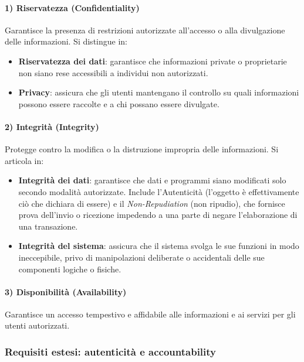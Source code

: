 \paragraph{1) Riservatezza (Confidentiality)}

Garantisce la presenza di restrizioni autorizzate all'accesso o alla divulgazione
delle informazioni. Si distingue in:
\begin{itemize}
\item \textbf{Riservatezza dei dati}: garantisce che informazioni private o
proprietarie non siano rese accessibili a individui non autorizzati.
\item \textbf{Privacy}: assicura che gli utenti mantengano il controllo su quali
informazioni possono essere raccolte e a chi possano essere divulgate.
\end{itemize}

\paragraph{2) Integrità (Integrity)}

Protegge contro la modifica o la distruzione impropria delle informazioni. Si
articola in:
\begin{itemize}
\item \textbf{Integrità dei dati}: garantisce che dati e programmi siano
modificati solo secondo modalità autorizzate. Include l'Autenticità (l'oggetto
è effettivamente ciò che dichiara di essere) e il \textit{Non-Repudiation}
(non ripudio), che fornisce prova dell'invio o ricezione impedendo a una parte
di negare l'elaborazione di una transazione.
\item \textbf{Integrità del sistema}: assicura che il sistema svolga le sue
funzioni in modo ineccepibile, privo di manipolazioni deliberate o accidentali
delle sue componenti logiche o fisiche.
\end{itemize}

\paragraph{3) Disponibilità (Availability)}

Garantisce un accesso tempestivo e affidabile alle informazioni e ai servizi
per gli utenti autorizzati.

\subsubsection{Requisiti estesi: autenticità e accountability}


